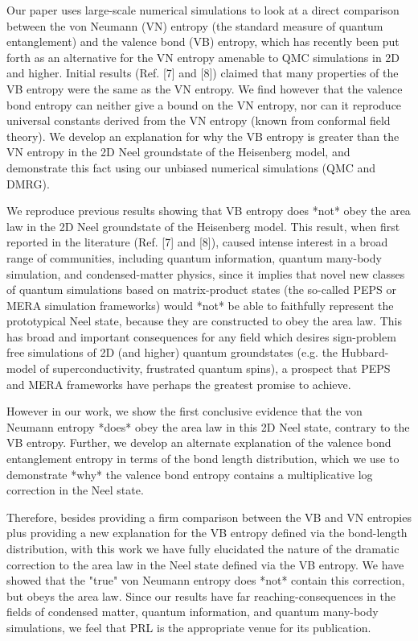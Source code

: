 Our paper uses large-scale numerical simulations to look at a direct comparison between the von Neumann (VN) entropy (the standard measure of quantum entanglement) and the valence bond (VB)  entropy, which has recently been put forth as an alternative for the VN entropy amenable to QMC simulations in 2D and higher.  Initial results (Ref. [7] and [8]) claimed that many properties of the VB entropy were the same as the VN entropy.  We find however that the valence bond entropy can neither give a bound on the VN entropy, nor can it reproduce universal constants derived from the VN entropy (known from conformal field theory).  We develop an explanation for why the VB entropy is greater than the VN entropy in the  2D Neel groundstate of the Heisenberg model, and demonstrate this fact using our unbiased numerical simulations (QMC and DMRG).

We reproduce previous results showing that VB entropy does *not* obey the area law in the 2D Neel groundstate of the Heisenberg model.  This result, when first reported in the literature (Ref. [7] and [8]), caused intense interest in a broad range of communities, including quantum information, quantum many-body simulation, and condensed-matter physics, since it implies that novel new classes of quantum simulations based on matrix-product states (the so-called PEPS or MERA simulation frameworks) would *not* be able to faithfully represent the prototypical Neel state, because they are constructed to obey the area law.  This has broad and important consequences for any field which desires sign-problem free simulations of 2D (and higher) quantum groundstates (e.g. the Hubbard-model of superconductivity, frustrated quantum spins), a prospect that PEPS and MERA frameworks have perhaps the greatest promise to achieve.

However in our work, we show the first conclusive evidence that the von Neumann entropy *does* obey the area law in this 2D Neel state, contrary to the VB entropy.  Further, we develop an alternate explanation of the valence bond entanglement entropy in terms of the bond length distribution, which we use to demonstrate *why* the valence bond entropy contains a multiplicative log correction in the Neel state.

Therefore, besides providing a firm comparison between the VB and VN entropies plus providing a new explanation for the VB entropy defined via the bond-length distribution, with this work we have fully elucidated the nature of the dramatic correction to the area law in the Neel state defined via the VB entropy.  We have showed that the "true" von Neumann entropy does *not* contain this correction, but obeys the area law. Since our results have far reaching-consequences in the fields of condensed matter, quantum information, and quantum many-body simulations, we feel that PRL is the appropriate venue for its publication.
